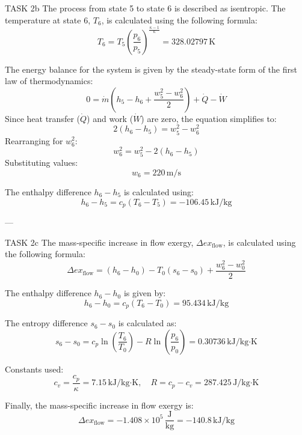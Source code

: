 TASK 2b  
The process from state 5 to state 6 is described as isentropic. The temperature at state 6, \( T_6 \), is calculated using the following formula:  
\[
T_6 = T_5 \left( \frac{p_6}{p_5} \right)^{\frac{\kappa - 1}{\kappa}} = 328.02797 \, \text{K}
\]

The energy balance for the system is given by the steady-state form of the first law of thermodynamics:  
\[
0 = \dot{m} \left( h_5 - h_6 + \frac{w_5^2 - w_6^2}{2} \right) + \dot{Q} - \dot{W}
\]  
Since heat transfer (\( \dot{Q} \)) and work (\( \dot{W} \)) are zero, the equation simplifies to:  
\[
2(h_6 - h_5) = w_5^2 - w_6^2
\]  
Rearranging for \( w_6^2 \):  
\[
w_6^2 = w_5^2 - 2(h_6 - h_5)
\]  
Substituting values:  
\[
w_6 = 220 \, \text{m/s}
\]

The enthalpy difference \( h_6 - h_5 \) is calculated using:  
\[
h_6 - h_5 = c_p (T_6 - T_5) = -106.45 \, \text{kJ/kg}
\]

---

TASK 2c  
The mass-specific increase in flow exergy, \( \Delta ex_{\text{flow}} \), is calculated using the following formula:  
\[
\Delta ex_{\text{flow}} = (h_6 - h_0) - T_0 (s_6 - s_0) + \frac{w_6^2 - w_0^2}{2}
\]

The enthalpy difference \( h_6 - h_0 \) is given by:  
\[
h_6 - h_0 = c_p (T_6 - T_0) = 95.434 \, \text{kJ/kg}
\]

The entropy difference \( s_6 - s_0 \) is calculated as:  
\[
s_6 - s_0 = c_p \ln \left( \frac{T_6}{T_0} \right) - R \ln \left( \frac{p_6}{p_0} \right) = 0.30736 \, \text{kJ/kg·K}
\]

Constants used:  
\[
c_v = \frac{c_p}{\kappa} = 7.15 \, \text{kJ/kg·K}, \quad R = c_p - c_v = 287.425 \, \text{J/kg·K}
\]

Finally, the mass-specific increase in flow exergy is:  
\[
\Delta ex_{\text{flow}} = -1.408 \times 10^5 \, \frac{\text{J}}{\text{kg}} = -140.8 \, \text{kJ/kg}
\]
